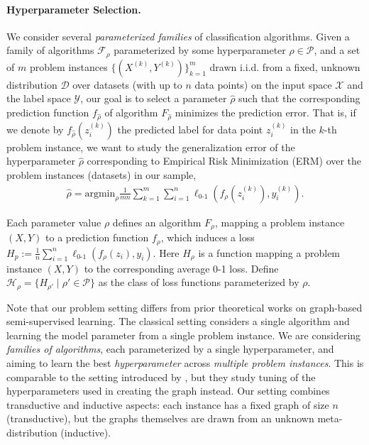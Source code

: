 \paragraph{Hyperparameter Selection.}
We consider several \emph{parameterized families} of classification algorithms. Given a family of algorithms $\mathcal{F}_{\rho}$ parameterized by some hyperparameter $\rho\in\mathcal{P}$, and a set of $m$ problem instances $\{(X^{(k)}, Y^{(k)})\}_{k=1}^m$ drawn i.i.d.  from a fixed, unknown  distribution  $\mathcal{D}$ over datasets (with up to $n$ data points) on the input space $\mathcal{X}$ and the label space $\mathcal{Y}$, our goal is to
select a parameter $\hat{\rho}$ such that the corresponding prediction function $f_{\hat \rho}$ of algorithm $F_{\hat \rho}$ minimizes the prediction error. That is, if we denote by $f_{\hat \rho}(z_i^{(k)})$  the predicted label for data point $z_i^{(k)}$ in the $k$-th problem instance, we want to study the generalization error of the hyperparameter $\hat{\rho}$ corresponding to Empirical Risk Minimization (ERM) over the  problem instances (datasets) in our sample,
\begin{align*}
\hat{\rho} = \text{argmin}_{\rho} \frac{1}{mn}\sum_{k=1}^m \sum_{i=1}^n \ell_{\mathrm{0\text{-}1}}(f_\rho(z_i^{(k)}), y_i^{(k)}).
\end{align*}\label{eqn:algo selection obj}

\noindent Each parameter value $\rho$ defines an algorithm $F_\rho$, mapping a problem instance $(X, Y)$ to a prediction function $f_\rho$, which induces a loss $H_p:=\frac{1}{n}\sum_{i=1}^n \ell_{0\text{-}1}(f_\rho(z_i), y_i)$. Here $H_\rho$ is a function mapping a  problem instance $(X, Y)$ to the corresponding average 0-1 loss. Define $\mathcal{H}_\rho = \{{H_{\rho'}}\mid{\rho'}\in \mathcal{P}\}$ as the class of loss functions parameterized by $\rho$.

Note that our problem setting differs from prior theoretical works on graph-based semi-supervised learning. 
The classical setting considers a single algorithm and learning the model parameter from a single problem instance. We are considering \emph{families of algorithms}, each parameterized by a single hyperparameter, and aiming to learn the best \textit{hyperparameter} across \textit{multiple problem instances}. This is comparable to the setting introduced by \cite{balcan2021data}, but they study tuning of the  hyperparameters used in creating the graph instead.
Our setting combines transductive and inductive aspects: each instance has a fixed graph of size $n$ (transductive), but the graphs themselves are drawn from an unknown meta-distribution (inductive).


